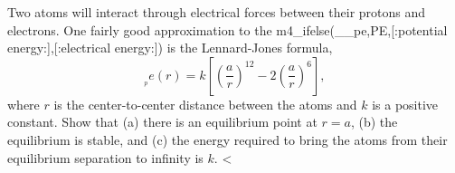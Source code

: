 Two atoms will interact through electrical forces between
their protons and electrons. One fairly good approximation
to the m4_ifelse(__pe,PE,[:potential energy:],[:electrical energy:]) is the Lennard-Jones formula,
\begin{equation*}
   __pe (r) = k\left[\left(\frac{a}{r}\right)^{12}-2\left(\frac{a}{r}\right)^{6}\right],
\end{equation*}
where $r$ is the center-to-center distance between the atoms and $k$ is a positive constant.
Show that (a) there is an equilibrium point at $r=a$,\hwendpart
(b) the equilibrium is stable, and\hwendpart
(c) the energy required to bring
the atoms from their equilibrium separation to infinity is
$k$. <%

